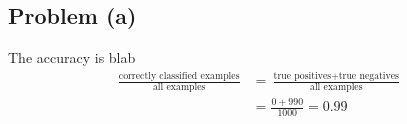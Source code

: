 \subsection*{Problem (a)}

The accuracy is blab 
\[
\begin{aligned}\frac{\text{correctly classified examples}}{\text{all examples}} & =\frac{\text{true positives}+\text{true negatives}}{\text{all examples}}\\
 & =\frac{0+990}{1000}=0.99
\end{aligned}
\]